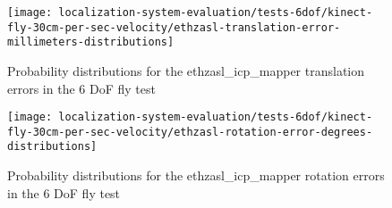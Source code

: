 \begin{figure}[H]
	\centering
	\texttt{[image: localization-system-evaluation/tests-6dof/kinect-fly-30cm-per-sec-velocity/ethzasl-translation-error-millimeters-distributions]}
	\caption{Probability distributions for the ethzasl\_icp\_mapper translation errors in the 6 DoF fly test}
	\label{fig:localization-system-evaluation_kinect-fly-30cm-per-sec-velocity-translation-error-asl}
\end{figure}

\begin{figure}[H]
	\centering
	\texttt{[image: localization-system-evaluation/tests-6dof/kinect-fly-30cm-per-sec-velocity/ethzasl-rotation-error-degrees-distributions]}
	\caption{Probability distributions for the ethzasl\_icp\_mapper rotation errors in the 6 DoF fly test}
	\label{fig:localization-system-evaluation_kinect-fly-30cm-per-sec-velocity-rotation-error-asl}
\end{figure}


